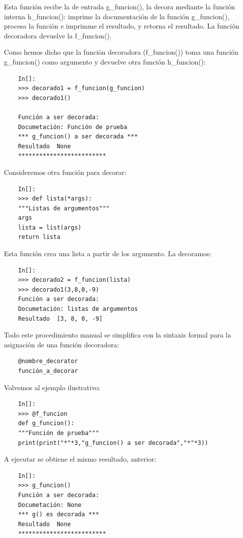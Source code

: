 Esta función recibe la de entrada {\ttfamily g\_funcion()}, la decora mediante la  función interna {\ttfamily h\_funcion()}:  imprime la documentación de la función {\ttfamily g\_funcion()},  procesa la función e imprimme el resultado, y retorna el resultado.  La función decoradora devuelve la {\ttfamily f\_funcion()}.  


Como hemos dicho que la función decoradora ({\ttfamily f\_funcion()}) toma una función  {\ttfamily g\_funcion()} como argumento y devuelve otra función  {\ttfamily h\_funcion()}:

\begin{lstlisting}
	In[]:
	>>> decorado1 = f_funcion(g_funcion)
	>>> decorado1()
	
	Función a ser decorada:
	Documetación: Función de prueba
	*** g_funcion() a ser decorada ***
	Resultado  None
	************************* 	
\end{lstlisting}



Consideremos otra función para decorar: 
\begin{lstlisting}
	In[]:
	>>> def lista(*args):
	"""Listas de argumentos"""
	args
	lista = list(args)
	return lista
\end{lstlisting}

Esta función crea una lista a partir de los argumento. La decoramos:

\begin{lstlisting}
	In[]:
	>>> decorado2 = f_funcion(lista)
	>>> decorado1(3,8,0,-9)
	Función a ser decorada:
	Documetación: listas de argumentos
	Resultado  [3, 8, 0, -9]
\end{lstlisting}

Todo este procedimiento manual se simplifica con la sintaxis formal para la asignación de una función decoradora:

\begin{lstlisting}
	@nombre_decorator
	función_a_decorar	
\end{lstlisting}

Volvemos al ejemplo ilustrativo:

\begin{lstlisting}
	In[]:
	>>> @f_funcion
	def g_funcion():
	"""Función de prueba"""
	print(print("*"*3,"g_funcion() a ser decorada","*"*3))
\end{lstlisting}
A ejecutar se obtiene el mismo resultado, anterior:        
\begin{lstlisting}
	In[]:
	>>> g_funcion()
	Función a ser decorada:
	Documetación: None
	*** g() es decorada ***
	Resultado  None
	************************* 
	
\end{lstlisting}

